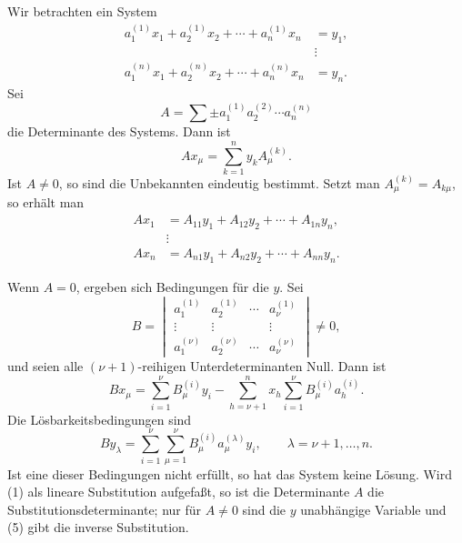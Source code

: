 \documentclass[11pt]{article}
\begin{document}
Wir betrachten ein System
\begin{equation}
\begin{aligned}
 a_1^{(1)}x_1+a_2^{(1)}x_2+\cdots+a_n^{(1)}x_n&=y_1,\\
 &\vdots\\
 a_1^{(n)}x_1+a_2^{(n)}x_2+\cdots+a_n^{(n)}x_n&=y_n.
\end{aligned}
\tag{1}
\end{equation}
Sei
\begin{equation}
        A=\sum\pm a_1^{(1)}a_2^{(2)}\cdots a_n^{(n)}
\tag{2}
\end{equation}
die Determinante des Systems.  Dann ist
\begin{equation}
        A x_\mu=\sum_{k=1}^{n}y_k A_\mu^{(k)}.
\tag{4}
\end{equation}
Ist \(A\ne0\), so sind die Unbekannten eindeutig bestimmt.  Setzt man \(A_\mu^{(k)}=A_{k\mu}\), so erhält man
\begin{equation}
\begin{aligned}
 A x_1&=A_{11}y_1+A_{12}y_2+\cdots+A_{1n}y_n,\\
 &\vdots\\
 A x_n&=A_{n1}y_1+A_{n2}y_2+\cdots+A_{nn}y_n.
\end{aligned}
\tag{5}
\end{equation}

Wenn \(A=0\), ergeben sich Bedingungen für die \(y\).  Sei
\begin{equation}
        B=\begin{vmatrix}
        a_1^{(1)}&a_2^{(1)}&\cdots&a_\nu^{(1)}\\
        \vdots&\vdots&&\vdots\\
        a_1^{(\nu)}&a_2^{(\nu)}&\cdots&a_\nu^{(\nu)}
        \end{vmatrix}\ne0,
\tag{6}
\end{equation}
und seien alle \((\nu+1)\)-reihigen Unterdeterminanten Null.  Dann ist
\begin{equation}
        Bx_\mu=\sum_{i=1}^{\nu}B_\mu^{(i)}y_i
        -\sum_{h=\nu+1}^{n}x_h\sum_{i=1}^{\nu}B_\mu^{(i)}a_h^{(i)}.
\tag{7}
\end{equation}
Die Lösbarkeitsbedingungen sind
\begin{equation}
        B y_\lambda=\sum_{i=1}^{\nu}\sum_{\mu=1}^{\nu}
        B_\mu^{(i)}a_\mu^{(\lambda)}y_i,
        \qquad \lambda=\nu+1,\ldots,n.
\tag{10}
\end{equation}
Ist eine dieser Bedingungen nicht erfüllt, so hat das System keine Lösung.  Wird (1) als lineare Substitution aufgefaßt, so ist die Determinante \(A\) die Substitutionsdeterminante; nur für \(A\ne0\) sind die \(y\) unabhängige Variable und (5) gibt die inverse Substitution.
\end{document}
